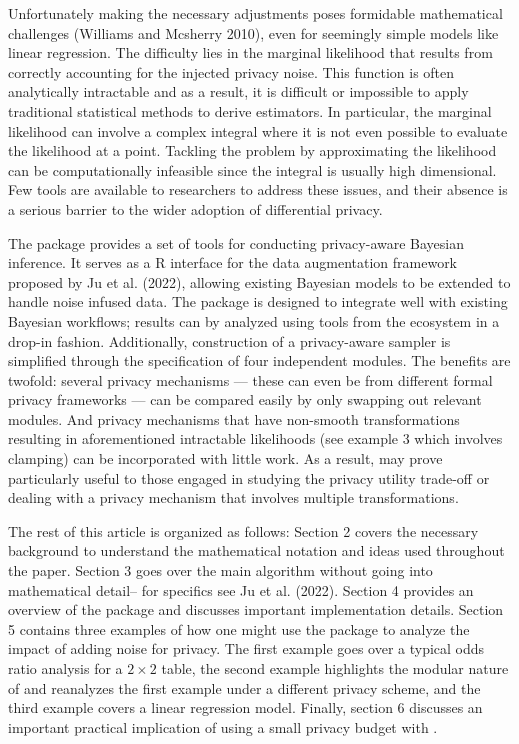 Unfortunately making the necessary adjustments poses formidable mathematical
challenges (Williams and Mcsherry 2010), even for seemingly simple models like linear regression.
The difficulty lies in the marginal likelihood that results from correctly accounting for the injected
privacy noise. This function is often analytically intractable and as a result,
it is difficult or impossible to apply traditional statistical methods
to derive estimators. In particular, the marginal likelihood can involve a complex
integral where it is not even possible to evaluate the likelihood
at a point. Tackling the problem by approximating the likelihood can be computationally
infeasible since the integral is usually high dimensional.
Few tools are available to researchers to address these issues,
and their absence is a serious barrier to the wider adoption
of differential privacy.

The  package provides a set of tools for conducting
privacy-aware Bayesian inference. It serves as a R
interface for the data augmentation framework proposed by Ju et al. (2022),
allowing existing Bayesian models to be extended to handle
noise infused data. The package is designed to integrate well with existing Bayesian workflows;
results can by analyzed using tools from the  ecosystem in a drop-in fashion. Additionally,
construction of a privacy-aware sampler is simplified
through the specification of four independent modules.
The benefits are twofold: several privacy mechanisms --- these can even be from different formal privacy frameworks ---
can be compared easily by only swapping out relevant modules. And privacy mechanisms
that have non-smooth transformations resulting in aforementioned intractable likelihoods
(see example 3 which involves clamping) can be incorporated with little work. As a result,
 may prove particularly useful to those engaged in studying the privacy utility trade-off or dealing with a privacy mechanism that involves multiple transformations.

The rest of this article is organized as follows:
Section 2 covers the necessary background to understand the mathematical notation
and ideas used throughout the paper. Section 3 goes over the main algorithm without
going into mathematical detail-- for specifics see Ju et al. (2022). Section 4 provides
an overview of the  package and discusses important implementation details.
Section 5 contains three examples of how one might use the package to analyze the
impact of adding noise for privacy. The first example goes over a typical
odds ratio analysis for a \(2 \times 2\) table, the second example highlights
the modular nature of  and reanalyzes the first example under a different
privacy scheme, and the third example covers a linear regression model. Finally, section 6 discusses
an important practical implication of using a small privacy budget with .

